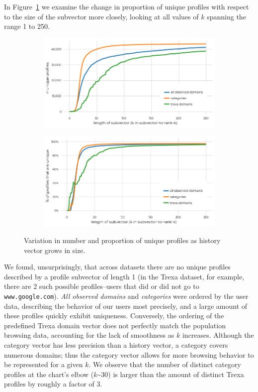 \documentclass[letterpaper,twocolumn,10pt]{article}
\begin{document}
In Figure~\ref{fig:unique_profiles_by_trexa_rank} we examine the change in proportion of unique profiles with respect to the size of the subvector more closely, looking at all values of $k$ spanning the range 1 to 250.
%
\begin{figure}[htbp]
\begin{subfigure}{.9\linewidth}
    \centering
    \includegraphics[width=0.9\linewidth]{figures/fig-5-a-n-unique.png}
\end{subfigure}
\begin{subfigure}{.9\linewidth}
    \centering
    \includegraphics[width=0.9\linewidth]{figures/fig-5-b-percent.png}
\end{subfigure}
    \caption{Variation in number and proportion of unique profiles as history vector grows in size.}
    \label{fig:unique_profiles_by_trexa_rank}
\end{figure}
%
We found, unsurprisingly, that across datasets there are no unique profiles described by a profile subvector of length 1 (in the Trexa dataset, for example, there are 2 such possible profiles--users that did or did not go to \texttt{www.google.com}).
\textit{All observed domains} and \textit{categories} were ordered by the user data, describing the behavior of our users most precisely, and a large amount of these profiles quickly exhibit uniqueness.
Conversely, the ordering of the predefined Trexa domain vector does not perfectly match the population browsing data, accounting for the lack of smoothness as $k$ increases.
Although the category vector has less precision than a history vector, a category covers numerous domains; thus the category vector allows for more browsing behavior to be represented for a given $k$.
We observe that the number of distinct category profiles at the chart's elbow ($k$\textasciitilde{}30) is larger than the amount of distinct Trexa profiles by roughly a factor of 3.
\end{document}
